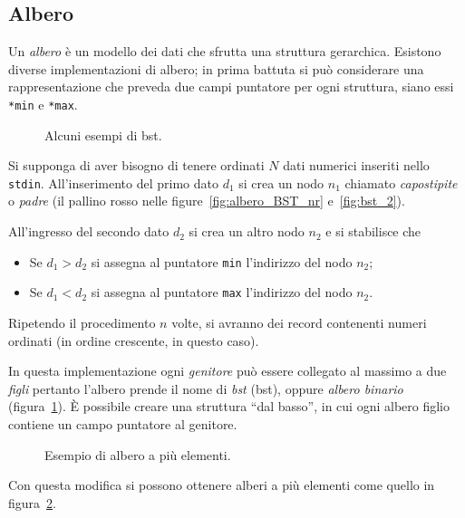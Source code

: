 		\subsection{Albero}
		\label{subsec:albero}
Un \emph{albero} è un modello dei dati che sfrutta una struttura gerarchica.
Esistono diverse implementazioni di albero; in prima battuta si può considerare una rappresentazione che preveda due campi puntatore per ogni struttura, siano essi \lstinline!*min! e \lstinline!*max!.

\begin{figure}
	\centering
{}\quad
{}
	\caption{Alcuni esempi di \acs{bst}.}
	\label{fig:bst}
\end{figure}
Si supponga di aver bisogno di tenere ordinati $N$ dati numerici inseriti nello \lstinline!stdin!.
All'inserimento del primo dato $d_1$ si crea un nodo $n_1$ chiamato \emph{capostipite} o \emph{padre} (il pallino rosso nelle figure~\ref{fig:albero_BST_nr} e~\ref{fig:bst_2}).


All'ingresso del secondo dato $d_2$ si crea un altro nodo $n_2$ e si stabilisce che
\begin{itemize}
	\item
Se $d_1>d_2$ si assegna al puntatore \lstinline!min! l'indirizzo del nodo $n_2$;
	\item
Se $d_1<d_2$ si assegna al puntatore \lstinline!max! l'indirizzo del nodo $n_2$.
\end{itemize}
Ripetendo il procedimento $n$ volte, si avranno dei record contenenti numeri ordinati (in ordine crescente, in questo caso).


In questa implementazione ogni \emph{genitore} può essere collegato al massimo a due \emph{figli} pertanto l'albero prende il nome di \emph{\acl{bst}} {\small(\acs{bst})}, oppure \emph{albero binario} (figura~\ref{fig:bst}).
\`E possibile creare una struttura ``dal basso'', in cui ogni albero figlio contiene un campo puntatore al genitore.
\begin{figure}
	\centering

	\caption{Esempio di albero a più elementi.}
	\label{fig:+el-tree}
\end{figure}
Con questa modifica si possono ottenere alberi a più elementi come quello in figura~\ref{fig:+el-tree}.

